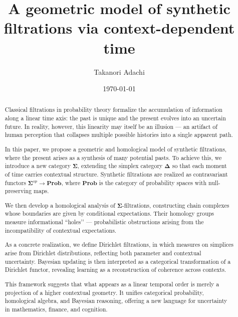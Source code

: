 \documentclass[12pt, a4paper]{amsart}
\title{A geometric model of synthetic filtrations via context-dependent time}
\author[T. Adachi]{Takanori Adachi}
\date{\today}
\theoremstyle{plain}
\theoremstyle{definition}
\numberwithin{figure}{section}
\numberwithin{table}{section}
\numberwithin{equation}{section}
\newcommand{\Prob}{\mathbf{Prob}}
\newcommand{\bDelta}{\mathbf{\Delta}}
\newcommand{\bSigma}{\mathbf{\Sigma}}
\begin{document}
\maketitle


\begin{abstract}
Classical filtrations in probability theory formalize the accumulation of information 
along a linear time axis: 
the past is unique and the present evolves into an uncertain future. 
In reality, however, 
this linearity may itself be an illusion
— an artifact of human perception 
that collapses multiple possible histories into a single apparent path.

In this paper, 
we propose a geometric and homological model of synthetic filtrations, 
where the present arises as a synthesis of many potential pasts. 
To achieve this, 
we introduce a new category $\bSigma$, 
extending the simplex category $\bDelta$ 
so that each moment of time carries contextual structure. 
Synthetic filtrations are realized as contravariant functors 
$\bSigma^{op} \to \Prob$, 
where $\Prob$ is the category of probability spaces with null-preserving maps.

We then develop a homological analysis of $\bSigma$-filtrations, 
constructing chain complexes whose boundaries are given by conditional expectations. 
Their homology groups measure informational ``holes’’ 
— probabilistic obstructions arising from the incompatibility of contextual expectations.

As a concrete realization, 
we define Dirichlet filtrations, 
in which measures on simplices arise from Dirichlet distributions, 
reflecting both parameter and contextual uncertainty. 
Bayesian updating is then interpreted as a categorical 
transformation of a Dirichlet functor, 
revealing learning as a reconstruction of coherence across contexts.

This framework suggests that 
what appears as a linear temporal order is merely a projection of a higher contextual geometry.
It unifies categorical probability, homological algebra, and Bayesian reasoning, 
offering a new language for uncertainty in mathematics, finance, and cognition.
\end{abstract}



\end{document}
